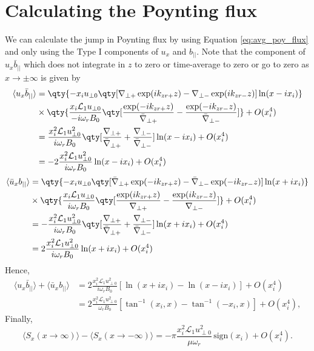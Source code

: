 \section{Calculating the Poynting flux}
\label{sec:poy_flux_appendix}

We can calculate the jump in Poynting flux by using Equation \eqref{eq:avg_poy_flux} and only using the Type I components of $u_x$ and $b_{||}$. Note that the component of $u_x\bar{b}_{||}$ which does not integrate in $z$ to zero or time-average to zero or go to zero as $x\rightarrow\pm\infty$ is given by
\[\begin{aligned}
\langle u_x\bar{b}_{||}\rangle&=\qty{-x_iu_{\perp0}\qty[\nabla_{\perp+}\exp(ik_{zr+}z) - \nabla_{\perp-}\exp(ik_{zr-}z)] \ln(x-ix_i)}  \\
&\times\qty{\frac{x_i\mathcal{L}_1u_{\perp0}}{-i\omega_r B_0}\qty[\frac{\exp(-ik_{zr+}z)}{\bar{\nabla}_{\perp+}}-\frac{\exp(-ik_{zr-}z)}{\bar{\nabla}_{\perp-}}]} + O(x_i^4) \\
&=\frac{x_i^2\mathcal{L}_1u_{\perp0}^2}{i\omega_r B_0}\qty[\frac{\nabla_{\perp+}}{\bar{\nabla}_{\perp+}}+\frac{\nabla_{\perp-}}{\bar{\nabla}_{\perp-}}]\ln(x-ix_i) + O(x_i^4) \\
&=-2\frac{x_i^2\mathcal{L}_1u_{\perp0}^2}{i\omega_r B_0}\ln(x-ix_i) + O(x_i^4) \\
\end{aligned}\]
\[\begin{aligned}
\langle \bar{u}_xb_{||} \rangle&=\qty{-x_iu_{\perp0}\qty[\bar{\nabla}_{\perp+}\exp(-ik_{zr+}z) - \bar{\nabla}_{\perp-}\exp(-ik_{zr-}z)] \ln(x+ix_i)}  \\
&\times\qty{\frac{x_i\mathcal{L}_1u_{\perp0}}{i\omega_r B_0}\qty[\frac{\exp(ik_{zr+}z)}{\nabla_{\perp+}}-\frac{\exp(ik_{zr-}z)}{\nabla_{\perp-}}]} + O(x_i^4) \\
&=-\frac{x_i^2\mathcal{L}_1u_{\perp0}^2}{i\omega_r B_0}\qty[\frac{\nabla_{\perp+}}{\bar{\nabla}_{\perp+}}+\frac{\nabla_{\perp-}}{\bar{\nabla}_{\perp-}}]\ln(x+ix_i) + O(x_i^4) \\
&=2\frac{x_i^2\mathcal{L}_1u_{\perp0}^2}{i\omega_r B_0}\ln(x+ix_i) + O(x_i^4) \\
\end{aligned}\]
Hence,
\[\begin{aligned}
\langle u_x\bar{b}_{||} \rangle + \langle \bar{u}_xb_{||} \rangle &=2\frac{x_i^2\mathcal{L}_1u_{\perp0}^2}{i\omega_r B_0}[\ln(x+ix_i)-\ln(x-ix_i)] + O(x_i^4) \\
&=2\frac{x_i^2\mathcal{L}_1u_{\perp0}^2}{\omega_r B_0}[\tan^{-1}(x_i,x) - \tan^{-1}(-x_i,x)] + O(x_i^4),
\end{aligned}\]
Finally,
\begin{equation}
    \label{eq:jump_in_poy_flux}
    \langle S_x(x\rightarrow\infty) \rangle - \langle S_x(x\rightarrow-\infty) \rangle = -\pi\frac{x_i^2\mathcal{L}_1u_{\perp0}^2}{\mu\omega_r}\,\text{sign}(x_i) + O(x_i^4).
\end{equation}